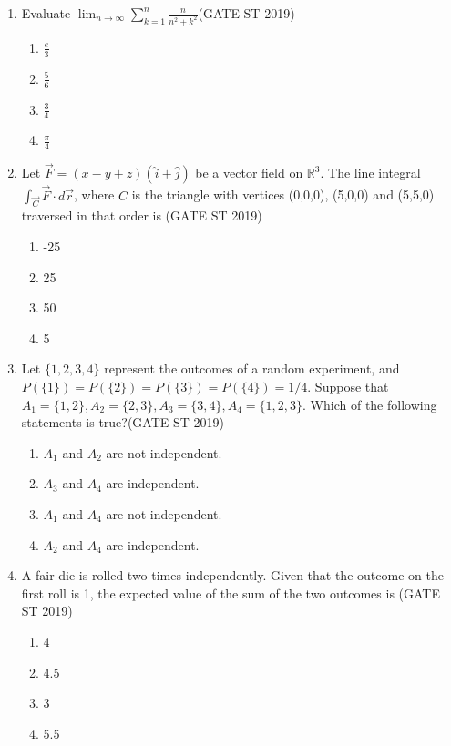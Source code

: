\documentclass[journal]{IEEEtran}
\begin{document}
\begin{enumerate}[start=1]
    \item Evaluate  \(\lim_{n \to \infty} \sum_{k=1}^{n} \frac{n}{n^2 + k^2}\)\hfill(GATE ST 2019)
\begin{multicols}{4}
\begin{enumerate}
    \item \( \frac{e}{3} \)
    \item \( \frac{5}{6} \)
    \item \( \frac{3}{4} \)
    \item \( \frac{\pi}{4} \)
\end{enumerate}
\end{multicols}

\item Let \( \vec{F} = (x - y + z)(\hat{i} + \hat{j}) \) be a vector field on \( \mathbb{R}^3 \). The line integral \( \int_{\vec{C}} \vec{F} \cdot d\vec{r} \), where \( C \) is the triangle with vertices (0,0,0), (5,0,0) and (5,5,0) traversed in that order is  \hfill(GATE ST 2019)
\begin{multicols}{4}
\begin{enumerate}
    \item -25 
    \item 25 
    \item 50   
    \item 5 
\end{enumerate}
\end{multicols}

\item Let \(\{1,2,3,4\}\) represent the outcomes of a random experiment, and \(P(\{1\}) = P(\{2\}) = P(\{3\}) = P(\{4\}) = 1/4\). Suppose that \(A_1 = \{1,2\}, A_2 = \{2,3\},  A_3 = \{3,4\}, A_4 = \{1,2,3\}\).
Which of the following statements is true?\hfill(GATE ST 2019)
\begin{enumerate}
    \item \(A_1\) and \(A_2\) are not independent. 
    \item \(A_3\) and \(A_4\) are independent. 
    \item \(A_1\) and \(A_4\) are not independent. 
    \item \(A_2\) and \(A_4\) are independent. 
\end{enumerate}

\item A fair die is rolled two times independently. Given that the outcome on the first roll is 1, the expected value of the sum of the two outcomes is \hfill(GATE ST 2019)
\begin{multicols}{4}
\begin{enumerate}
    \item 4
    \item 4.5
    \item 3
    \item 5.5
\end{enumerate}
\end{multicols}


\end{enumerate}
\end{document}
